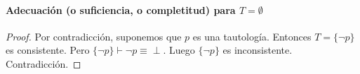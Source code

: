 \paragraph*{Adecuación (o suficiencia, o completitud) para $T=\emptyset$}\mbox{}
\begin{proof}
	Por contradicción, suponemos que $p$ es una tautología. Entonces $T = \{\neg p \}$ es consistente. Pero $\{\neg p\}\vdash \neg p\equiv \perp$. Luego $\{\neg p\}$ es inconsistente. Contradicción.
\end{proof}